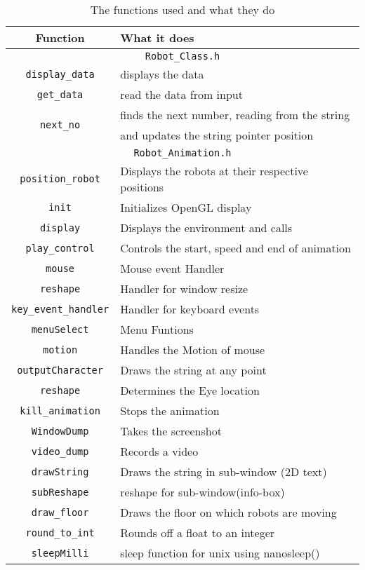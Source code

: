\documentclass[10pt,a4paper]{article}
\begin{document}
\begin{table}[ht]
\centering
\begin{tabular}{|c|l|}
\hline
Function & What it does \\
\hline
\multicolumn{2}{|c|}{\texttt{Robot\_Class.h}} \\
\hline
\texttt{display\_data} & displays the data \\
\hline
\texttt{get\_data} & read the data from input \\
\hline
\multirow{2}{*}{\texttt{next\_no}} & finds the next number, reading from the string\\
 & and updates the string pointer position \\
\hline
\multicolumn{2}{|c|}{\texttt{Robot\_Animation.h}} \\
\hline
\texttt{position\_robot} & Displays the robots at their respective positions \\
\hline
\texttt{init} & Initializes OpenGL display \\
\hline
\texttt{display} & Displays the environment and calls \\
\hline
\texttt{play\_control} & Controls the start, speed and end of animation \\
\hline
\texttt{mouse} & Mouse event Handler \\
\hline
\texttt{reshape} & Handler for window resize \\
\hline
\texttt{key\_event\_handler} & Handler for keyboard events \\
\hline
\texttt{menuSelect} & Menu Funtions \\
\hline
\texttt{motion} & Handles the Motion of mouse \\
\hline
\texttt{outputCharacter} & Draws the string at any point \\
\hline
\texttt{reshape} & Determines the Eye location \\
\hline
\texttt{kill\_animation} & Stops the animation \\
\hline
\texttt{WindowDump} & Takes the screenshot \\
\hline
\texttt{video\_dump} & Records a video \\
\hline
\texttt{drawString} & Draws the string in sub-window (2D text) \\
\hline
\texttt{subReshape} & reshape for sub-window(info-box) \\
\hline
\texttt{draw\_floor} & Draws the floor on which robots are moving \\
\hline
\texttt{round\_to\_int} & Rounds off a float to an integer \\
\hline
\texttt{sleepMilli} & sleep function for unix using nanosleep()\\
\hline
\end{tabular}
\caption{The functions used and what they do}
\end{table}
%
%
\end{document}
